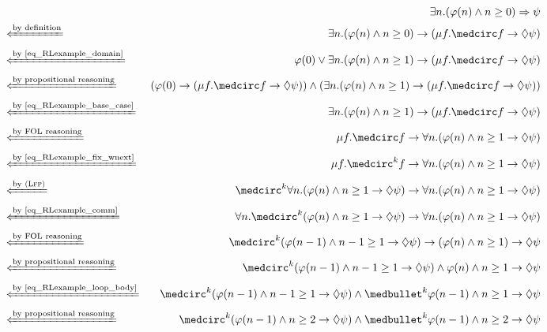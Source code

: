 \documentclass{amsart}
\begin{document}
\begin{figure}
	{
		\small
		\begin{align*}
		&&
		\exists n . (\varphi(n) \wedge n \ge 0) \To \psi
		\\
		&\xif{by definition}&
		\exists n . (\varphi(n) \wedge n \ge 0) \imp (\mu f . \wnext f 
		\imp \eventually\psi)
		\\
		&\xif{by~\eqref{eq_RLexample_domain}}&
		\varphi(0) \vee \exists n . (\varphi(n) \wedge n \ge 1)
		\imp (\mu f . \wnext f \imp\eventually \psi)
		\\
		&\xif{by propositional reasoning}&
		(\varphi(0) \imp (\mu f . \wnext f \imp\eventually \psi))
		\wedge (\exists n . (\varphi(n) \wedge n \ge 1)
		\imp (\mu f . \wnext f \imp\eventually \psi))
		\\
		&\xif{by~\eqref{eq_RLexample_base_case}}&
		\exists n . (\varphi(n) \wedge n \ge 1)
		\imp (\mu f . \wnext f \imp\eventually \psi)
		\\
		&\xif{by FOL reasoning}&
		\mu f . \wnext f \imp \forall n .
		(\varphi(n) \wedge n \ge 1 \imp \eventually \psi)
		\\
		&\xif{by~\eqref{eq_RLexample_fix_wnext}}&
		\mu f . \wnext^k f \imp \forall n .
		(\varphi(n) \wedge n \ge 1 \imp \eventually \psi)
		\\
		&\xif{by~\Lfp}&
		\wnext^k \forall n . (\varphi(n) \wedge n \ge 1 \imp \eventually \psi)
		\imp
		\forall n . (\varphi(n) \wedge n \ge 1 \imp \eventually \psi)
		\\
		&\xif{by~\eqref{eq_RLexample_comm}}&
		\forall n . \wnext^k  (\varphi(n) \wedge n \ge 1 \imp \eventually \psi)
		\imp
		\forall n . (\varphi(n) \wedge n \ge 1 \imp \eventually \psi)
		\\
		&\xif{by FOL reasoning}&
		\wnext^k  (\varphi(n-1) \wedge n-1 \ge 1 \imp \eventually \psi)
		\imp
		(\varphi(n) \wedge n \ge 1) \imp \eventually \psi
		\\
		&\xif{by propositional reasoning}&
		\wnext^k  (\varphi(n-1) \wedge n-1 \ge 1 \imp \eventually \psi)
		\wedge
		\varphi(n) \wedge n \ge 1 \imp \eventually \psi
		\\
		&\xif{by~\eqref{eq_RLexample_loop_body}}&
		\wnext^k  (\varphi(n-1) \wedge n-1 \ge 1 \imp \eventually \psi)
		\wedge
		\snext^k \varphi(n-1) \wedge n \ge 1 \imp \eventually \psi
		\\
		&\xif{by propositional reasoning}&
		\wnext^k  (\varphi(n-1) \wedge n \ge 2 \imp \eventually \psi)
		\wedge \snext^k \varphi(n-1) \wedge n \ge 2 \imp \eventually \psi
		\\&&

\end{align*}}
\end{figure}
\end{document}

